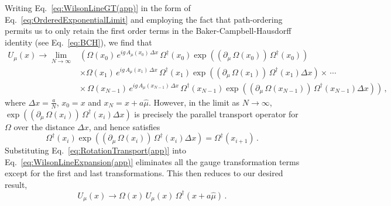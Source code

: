 Writing Eq.~\eqref{eq:WilsonLineGT(app)} in the form of Eq.~\eqref{eq:OrderedExponentialLimit} and employing the fact that path-ordering permits us to only retain the first order terms in the Baker-Campbell-Hausdorff identity (see Eq.~\eqref{eq:BCH}), we find that
%
\begin{align}
U_\mu(x)\rightarrow \lim_{N\rightarrow\infty} &\left( \Omega(x_0)\,e^{ig\,A_\mu(x_0)\,\Delta x}\,\Omega^\dagger(x_0) \exp\left((\partial_\mu\,\Omega(x_0))\,\Omega^\dagger(x_0)\right)\right.\nonumber\\
&\times \Omega(x_1)\,e^{ig\,A_\mu(x_1)\,\Delta x}\,\Omega^\dagger(x_1) \exp\left((\partial_\mu\,\Omega(x_1))\,\Omega^\dagger(x_1)\Delta x\right) \times \, \cdots \nonumber\\
&\left. \times \, \Omega(x_{N-1})\,e^{ig\,A_\mu(x_{N-1})\,\Delta x}\,\Omega^\dagger(x_{N-1}) \exp\left((\partial_\mu\,\Omega(x_{N-1}))\,\Omega^\dagger(x_{N-1})\Delta x\right) \right)\, , \label{eq:WilsonLineExpansion(app)}
\end{align}
%
where $\Delta x = \frac{a}{N}$, $x_0=x$ and $x_N = x+a\hat{\mu}$. However, in the limit as $N\rightarrow\infty$, $\exp\left((\partial_\mu\,\Omega(x_i))\,\Omega^\dagger(x_i)\Delta x \right)$ is precisely the parallel transport operator for $\Omega$ over the distance $\Delta x$, and hence satisfies 
%
\begin{equation}
\Omega^\dagger(x_i)\exp\left((\partial_\mu\,\Omega(x_i))\,\Omega^\dagger(x_i)\Delta x \right) = \Omega^\dagger(x_{i+1})\, .
\label{eq:RotationTransport(app)}
\end{equation}
%
Substituting Eq.~\eqref{eq:RotationTransport(app)} into Eq.~\eqref{eq:WilsonLineExpansion(app)} eliminates all the gauge transformation terms except for the first and last transformations. This then reduces to our desired result,
%
\begin{equation}
U_\mu(x)\rightarrow \Omega(x)\,U_\mu(x)\,\Omega^\dagger(x+a\hat{\mu})\, .
\end{equation} 

